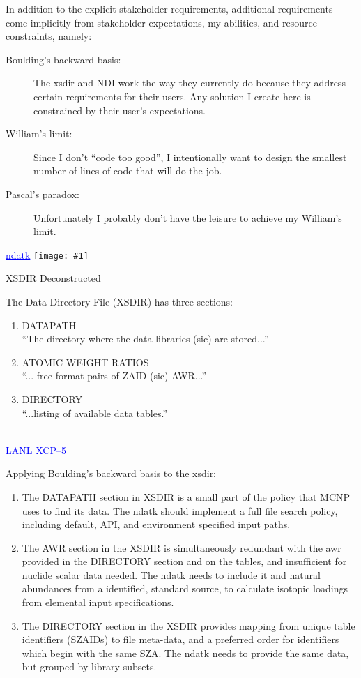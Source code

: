 \documentclass[clock]{slides}
\newenvironment{xslide}[1][logo.jpg]{\begin{slide} \tiny
\textcolor{blue}{\underline{ndatk}} \hfill
\texttt{[image: \#1]}
\normalsize}{\vfill\tiny
\textcolor{blue}{\hrulefill \\LANL XCP--5}
\end{slide}}
\begin{document}
\begin{note}\small
In addition to the explicit stakeholder requirements, additional
requirements come implicitly from stakeholder expectations, my
abilities, and resource constraints, namely:
\begin{description}
\item[Boulding's backward basis: ] The xsdir and NDI work the way they
  currently do because they address certain requirements for their
  users.  Any solution I create here is constrained by their user's
  expectations. 
\item[William's limit: ] Since I don't ``code too good'', I
  intentionally want to design the smallest number of lines of code
  that will do the job.
\item[Pascal's paradox: ] Unfortunately I probably don't have the
  leisure to achieve my William's limit.
\end{description}
\end{note}

\begin{xslide}
\begin{center}\Large
XSDIR Deconstructed
\end{center}
The Data Directory File (XSDIR) has three sections:
\begin{enumerate}
\item DATAPATH\\
  ``The directory where the data libraries (sic) are stored...''
\item ATOMIC WEIGHT RATIOS\\
  ``... free format pairs of ZAID (sic) AWR...''
\item DIRECTORY\\
``...listing of available data tables.''
\end{enumerate}
\end{xslide}

\begin{note}\small
Applying Boulding's backward basis to the xsdir:
\begin{enumerate}
\item The DATAPATH section in XSDIR is a small part of the policy that
  MCNP uses to find its data.  The ndatk should implement a full file
  search policy, including default, API, and environment specified
  input paths.
\item The AWR section in the XSDIR is simultaneously redundant with
  the awr provided in the DIRECTORY section and on the tables, and
  insufficient for nuclide scalar data needed.  The ndatk needs to
  include it and natural abundances from a identified, standard
  source, to calculate isotopic loadings from elemental input
  specifications.
\item The DIRECTORY section in the XSDIR provides mapping from unique
  table identifiers (SZAIDs) to file meta-data, and a preferred order
  for identifiers which begin with the same SZA.  The ndatk needs to
  provide the same data, but grouped by library subsets.
\end{enumerate}
\end{note}
\end{document}

